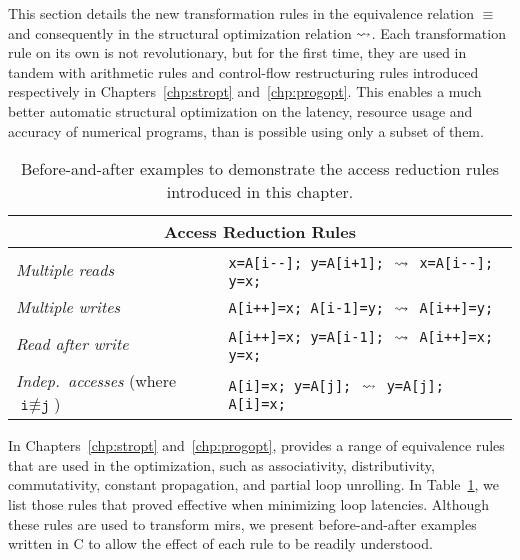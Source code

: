 This section details the new transformation rules in the equivalence relation
$\equiv$ and consequently in the structural optimization relation $\mathbin{\rightsquigarrow}$.
Each transformation rule on its own is not revolutionary, but for the
first time, they are used in tandem with arithmetic rules and control-flow
restructuring rules introduced respectively in Chapters~\ref{chp:stropt}
and~\ref{chp:progopt}.  This enables a much better automatic structural
optimization on the latency, resource usage and accuracy of numerical programs,
than is possible using only a subset of them.
\begin{table}[t]
    \caption{%
        Before-and-after examples to demonstrate the access reduction rules
        introduced in this chapter.}\label{lo:tab:rules}
    \newcommand\tstack[1]{\begin{tabular}[t]{@{}l@{}}#1\end{tabular}}
        \centering
    \begin{tabular}{@{}l@{~~~}l@{}}
        \hline
        \multicolumn{2}{c}{\textbf{Access Reduction Rules}}
        \\\hline
        \emph{Multiple reads} &
            \texttt{x=A[i-{}-]; y=A[i+1];} $~\mathbin{\rightsquigarrow}~$
            \texttt{x=A[i-{}-]; y=x;}
        \\\hline
        \emph{Multiple writes} &
            \texttt{A[i++]=x; A[i-1]=y;} $~\mathbin{\rightsquigarrow}~$
            \texttt{A[i++]=y;}
        \\\hline
        \emph{Read after write} &
            \texttt{A[i++]=x; y=A[i-1];} $~\mathbin{\rightsquigarrow}~$
            \texttt{A[i++]=x; y=x;}
        \\\hline
        \emph{Indep.\ accesses} (where $\texttt{i}\not\equiv\texttt{j}$) &
            \texttt{A[i]=x; y=A[j];} $~\mathbin{\rightsquigarrow}~$
            \texttt{y=A[j]; A[i]=x;}
        \\\hline
    \end{tabular}
\end{table}

In Chapters~\ref{chp:stropt} and~\ref{chp:progopt}, \soap{} provides a range
of equivalence rules that are used in the optimization, such as associativity,
distributivity, commutativity, constant propagation, and partial loop
unrolling.  In Table~\ref{lo:tab:rules}, we list those rules that proved
effective when minimizing loop latencies.  Although these rules are used to
transform \glspl{mir}, we present before-and-after examples written in C to
allow the effect of each rule to be readily understood.

